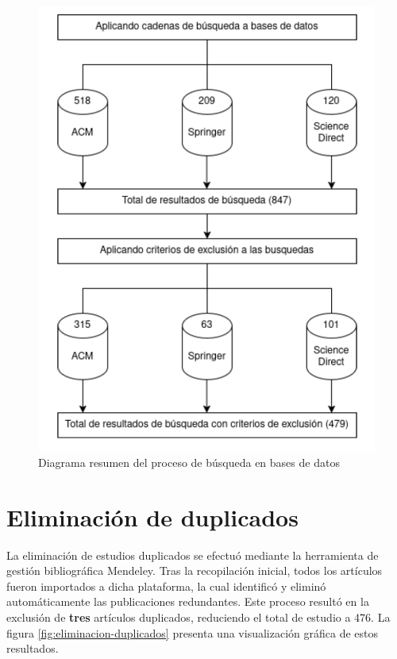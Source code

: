 \begin{figure}[H]
	\centering
	\includegraphics[scale=0.9] {tablas-images/sms/resumen_busqueda_bases.png}
	\caption{Diagrama resumen del proceso de búsqueda en bases de datos}\label{fig:resumen-busqueda-bases-de-datos}
\end{figure}




\section{Eliminación de duplicados}\label{sec:eliminacionDuplicados}
\noindent
La eliminación de estudios duplicados se efectuó mediante la herramienta de gestión bibliográfica Mendeley. Tras la recopilación inicial, todos los artículos fueron importados a dicha plataforma, la cual identificó y eliminó automáticamente las publicaciones redundantes. Este proceso resultó en la exclusión de \textbf{tres} artículos duplicados, reduciendo el total de estudio a 476. La figura \ref{fig:eliminacion-duplicados} presenta una visualización gráfica de estos resultados.


